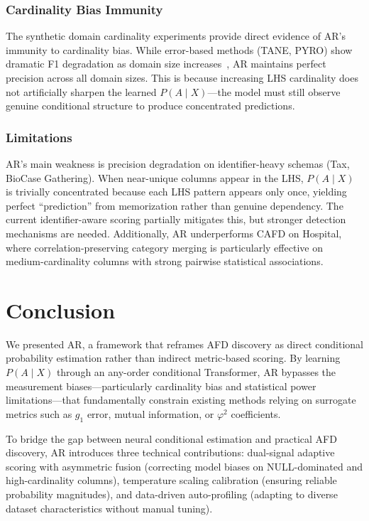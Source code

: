 \documentclass[conference]{IEEEtran}
\begin{document}
\subsubsection{Cardinality Bias Immunity}
The synthetic domain cardinality experiments provide direct evidence of AR's immunity to cardinality bias. While error-based methods (TANE, PYRO) show dramatic F1 degradation as domain size increases~\cite{measure_study}, AR maintains perfect precision across all domain sizes. This is because increasing LHS cardinality does not artificially sharpen the learned $P(A \mid X)$---the model must still observe genuine conditional structure to produce concentrated predictions.

\subsubsection{Limitations}
AR's main weakness is precision degradation on identifier-heavy schemas (Tax, BioCase Gathering). When near-unique columns appear in the LHS, $P(A \mid X)$ is trivially concentrated because each LHS pattern appears only once, yielding perfect ``prediction'' from memorization rather than genuine dependency. The current identifier-aware scoring partially mitigates this, but stronger detection mechanisms are needed. Additionally, AR underperforms CAFD on Hospital, where correlation-preserving category merging is particularly effective on medium-cardinality columns with strong pairwise statistical associations.

\section{Conclusion}\label{sec:conclusion}

We presented AR, a framework that reframes AFD discovery as direct conditional probability estimation rather than indirect metric-based scoring. By learning $P(A \mid X)$ through an any-order conditional Transformer, AR bypasses the measurement biases---particularly cardinality bias and statistical power limitations---that fundamentally constrain existing methods relying on surrogate metrics such as $g_1$ error, mutual information, or $\varphi^2$ coefficients.

To bridge the gap between neural conditional estimation and practical AFD discovery, AR introduces three technical contributions: dual-signal adaptive scoring with asymmetric fusion (correcting model biases on NULL-dominated and high-cardinality columns), temperature scaling calibration (ensuring reliable probability magnitudes), and data-driven auto-profiling (adapting to diverse dataset characteristics without manual tuning).
\end{document}
